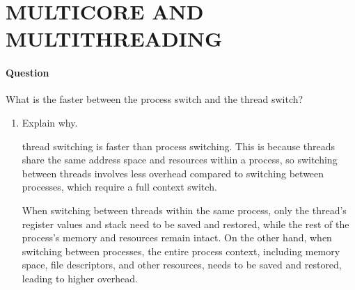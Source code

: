 \documentclass[a4paper,12pt,fleqn]{article}
\newcounter{question}
\newcommand*\question{%
\stepcounter{question}%
\paragraph{Question \thequestion}}
\begin{document}

\section{MULTICORE AND MULTITHREADING}

\question 
{
What is the faster between the process switch and the thread switch? 
}
\begin{enumerate}

\item
{
Explain why.
}
\begin{answer}
{
	thread switching is faster than process switching. This is because threads share the same address space and resources within a process, so switching between threads involves less overhead compared to switching between processes, which require a full context switch. 
	
	When switching between threads within the same process, only the thread's register values and stack need to be saved and restored, while the rest of the process's memory and resources remain intact. On the other hand, when switching between processes, the entire process context, including memory space, file descriptors, and other resources, needs to be saved and restored, leading to higher overhead.
}
\end{answer}

\end{enumerate}

\end{document}
